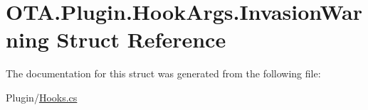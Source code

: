 \hypertarget{struct_o_t_a_1_1_plugin_1_1_hook_args_1_1_invasion_warning}{}\section{O\+T\+A.\+Plugin.\+Hook\+Args.\+Invasion\+Warning Struct Reference}
\label{struct_o_t_a_1_1_plugin_1_1_hook_args_1_1_invasion_warning}


The documentation for this struct was generated from the following file\+:\begin{DoxyCompactItemize}
\item 
Plugin/\hyperlink{_hooks_8cs}{Hooks.\+cs}\end{DoxyCompactItemize}
